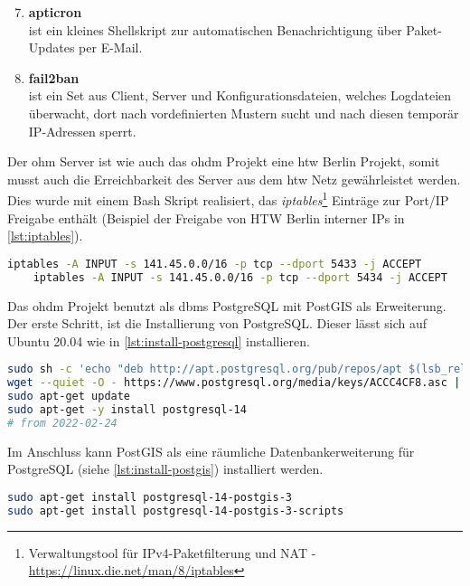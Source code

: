 \begin{enumerate}[label=\textbf{\arabic*.}]\setcounter{enumi}{6}
	\item \textbf{apticron}\\ist ein kleines Shellskript zur automatischen Benachrichtigung über Paket-Updates per E-Mail.
	\item \textbf{fail2ban} \\ist ein Set aus Client, Server und Konfigurationsdateien, welches Logdateien überwacht, dort nach vordefinierten Mustern sucht und nach diesen temporär IP-Adressen sperrt.
\end{enumerate}

Der \gls{ohm} Server ist wie auch das \gls{ohdm} Projekt eine \gls{htw} Berlin Projekt, somit musst auch die Erreichbarkeit des Server aus dem \gls{htw} Netz gewährleistet werden. Dies wurde mit einem Bash Skript realisiert, das \textit{iptables}\footnote{Verwaltungstool für IPv4-Paketfilterung und NAT - \url{https://linux.die.net/man/8/iptables}} Einträge zur Port/IP Freigabe enthält (Beispiel der Freigabe von  HTW Berlin interner IPs in \autoref{lst:iptables}).
\begin{lstlisting}[language=bash,caption={Freigabe aller HTW Berlin interner IPs auf 2 verschiedenen Ports},label={lst:iptables}]
	iptables -A INPUT -s 141.45.0.0/16 -p tcp --dport 5433 -j ACCEPT
	iptables -A INPUT -s 141.45.0.0/16 -p tcp --dport 5434 -j ACCEPT
\end{lstlisting}

Das \gls{ohdm} Projekt benutzt als \gls{dbms} PostgreSQL mit PostGIS\cite{postgis:manual} als Erweiterung.\\
Der erste Schritt, ist die Installierung von PostgreSQL. Dieser lässt sich auf Ubuntu 20.04 wie in \autoref{lst:install-postgresql} installieren.
\begin{lstlisting}[language=bash,caption={Installation PostgreSQL},label={lst:install-postgresql}]
sudo sh -c 'echo "deb http://apt.postgresql.org/pub/repos/apt $(lsb_release -cs)-pgdg main" > /etc/apt/sources.list.d/pgdg.list'
wget --quiet -O - https://www.postgresql.org/media/keys/ACCC4CF8.asc | sudo apt-key add -
sudo apt-get update
sudo apt-get -y install postgresql-14
# from 2022-02-24
\end{lstlisting}
Im Anschluss kann PostGIS\cite{postgis:manual} als eine räumliche Datenbankerweiterung für PostgreSQL (siehe \autoref{lst:install-postgis}) installiert werden.
\begin{lstlisting}[language=bash,caption={Installation PostGIS},label={lst:install-postgis}]
sudo apt-get install postgresql-14-postgis-3
sudo apt-get install postgresql-14-postgis-3-scripts
\end{lstlisting}

